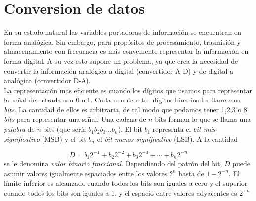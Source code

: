 \documentclass[11pt]{article} %
\begin{document}
\newpage

\section{Conversion de datos }

En su estado natural las variables portadoras de información se encuentran en forma analógica. Sin embargo, para propósitos de procesamiento, trasmisión y almacenamiento con frecuencia es más conveniente representar la información en forma digital. A su vez esto supone un problema, ya que crea la necesidad de convertir la información analógica a digital (convertidor A-D) y de digital a analógica (convertidor D-A). \\



La representación mas eficiente es cuando los dígitos que usamos para representar la señal de entrada son 0 o 1. Cada uno de estos dígitos binarios los llamamos \textit{bits}. La cantidad de ellos es arbitraria, de tal modo que podamos tener 1,2,3 o 8 \textit{bits} para representar una señal. Una cadena de $n$ bits forman lo que se llama una \textit{palabra} de $n$ bits (que sería $b_1b_2b_3...b_n$). El bit $b_1$ representa el \textit{bit más significativo} (MSB) y el bit $b_n$ el \textit{bit menos significativo} (LSB). A la cantidad 

\begin{equation}
D = b_1 2^{-1} + b_2 2^{-2} + b_3 2^{-3} + \cdots + b_n 2^{-n}
\end{equation}
se le denomina \textit{valor binario fraccional}. Dependiendo del patrón del bit, $D$ puede asumir valores igualmente espaciados entre los valores $2^n$ hasta de $1-2^{-n}$. El límite inferior es alcanzado cuando todos los bits son iguales a cero y el superior cuando todos los bits son iguales a 1, y el espacio entre valores adyacentes es $2^{-n}$
\end{document}
